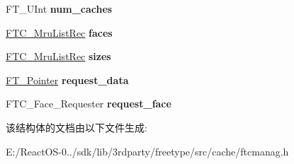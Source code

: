 \begin{DoxyCompactItemize}
F\+T\+\_\+\+U\+Int {\bfseries num\+\_\+caches}
\item 
\mbox{\label{struct_f_t_c___manager_rec___a4966919dd06b7e62f1296c95b6400c55}} 
\hyperlink{struct_f_t_c___mru_list_rec__}{F\+T\+C\+\_\+\+Mru\+List\+Rec} {\bfseries faces}
\item 
\mbox{\label{struct_f_t_c___manager_rec___ac73369768724b8c3bebd23697d4e24d9}} 
\hyperlink{struct_f_t_c___mru_list_rec__}{F\+T\+C\+\_\+\+Mru\+List\+Rec} {\bfseries sizes}
\item 
\mbox{\label{struct_f_t_c___manager_rec___a0b2fef4308a5fa792bc5017ad03095e8}} 
\hyperlink{interfacevoid}{F\+T\+\_\+\+Pointer} {\bfseries request\+\_\+data}
\item 
\mbox{\label{struct_f_t_c___manager_rec___a99195fc1d6b81a12957ba9cc0a6b7c93}} 
F\+T\+C\+\_\+\+Face\+\_\+\+Requester {\bfseries request\+\_\+face}
\end{DoxyCompactItemize}


该结构体的文档由以下文件生成\+:\begin{DoxyCompactItemize}
\item 
E\+:/\+React\+O\+S-\/0../sdk/lib/3rdparty/freetype/src/cache/ftcmanag.\+h\end{DoxyCompactItemize}

